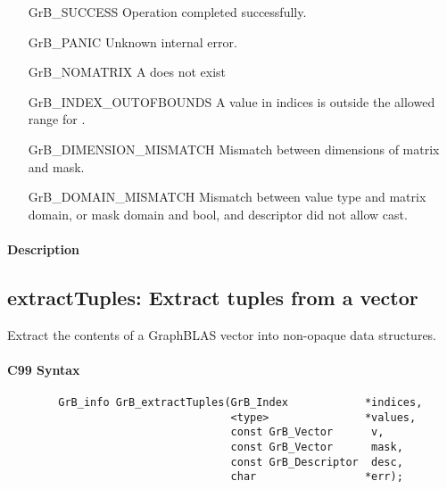 \begin{itemize}[leftmargin=2.1in]
    \item[{\sf GrB\_SUCCESS}]     Operation completed successfully.
    \item[{\sf GrB\_PANIC}]            Unknown internal error.
    \item[{\sf GrB\_NOMATRIX}]      {\sf A} does not exist
    \item[{\sf GrB\_INDEX\_OUTOFBOUNDS}]
                       A value in {\sf indices} is outside the allowed range for .
    \item[\sf GrB\_DIMENSION\_MISMATCH]  
                       Mismatch between dimensions of matrix and mask. 
    \item[\sf GrB\_DOMAIN\_MISMATCH]  
                       Mismatch between value type and matrix domain, or mask domain and {\sf bool}, and descriptor did not allow cast.
\end{itemize}

\paragraph{Description}



\subsection{{\sf extractTuples}: Extract tuples from a vector}
\label{Sec:extractTuples}

Extract the contents of a GraphBLAS vector into non-opaque data structures.

\paragraph{C99 Syntax}

\begin{verbatim}
        GrB_info GrB_extractTuples(GrB_Index            *indices,
                                   <type>               *values, 
                                   const GrB_Vector      v,
                                   const GrB_Vector      mask,
                                   const GrB_Descriptor  desc,
                                   char                 *err);

\end{verbatim}

